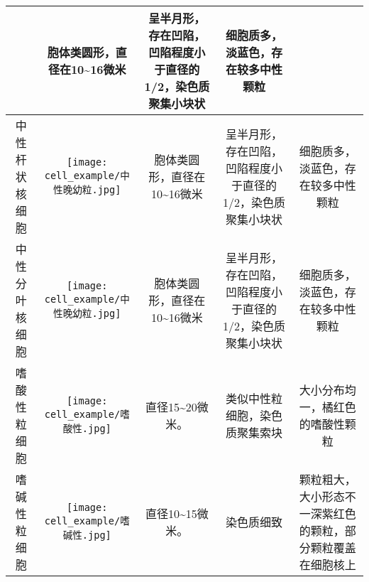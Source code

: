 \begin{longtable}{ccccc}
{\begin{minipage}[b]{0.15\textwidth}
  \end{minipage}} &  
  \multicolumn{1}{m{0.15\textwidth}}{胞体类圆形，直径在10\textasciitilde16微米} & 
  \multicolumn{1}{m{0.20\textwidth}}{呈半月形，存在凹陷，凹陷程度小于直径的1/2，染色质聚集小块状} & 
  \multicolumn{1}{m{0.20\textwidth}}{细胞质多，淡蓝色，存在较多中性颗粒}\\
  \midrule[0.5pt]
  中性杆状核细胞 & 
  \multicolumn{1}{m{0.15\textwidth}}{
  \begin{minipage}[b]{0.15\textwidth}
      \centering
      {\texttt{[image: cell\_example/中性晚幼粒.jpg]}}
  \end{minipage}} &  
  \multicolumn{1}{m{0.15\textwidth}}{胞体类圆形，直径在10\textasciitilde16微米} & 
  \multicolumn{1}{m{0.20\textwidth}}{呈半月形，存在凹陷，凹陷程度小于直径的1/2，染色质聚集小块状} & 
  \multicolumn{1}{m{0.20\textwidth}}{细胞质多，淡蓝色，存在较多中性颗粒}\\
  \midrule[0.5pt]
  中性分叶核细胞 & 
  \multicolumn{1}{m{0.15\textwidth}}{
  \begin{minipage}[b]{0.15\textwidth}
      \centering
      {\texttt{[image: cell\_example/中性晚幼粒.jpg]}}
  \end{minipage}} &  
  \multicolumn{1}{m{0.15\textwidth}}{胞体类圆形，直径在10\textasciitilde16微米} & 
  \multicolumn{1}{m{0.20\textwidth}}{呈半月形，存在凹陷，凹陷程度小于直径的1/2，染色质聚集小块状} & 
  \multicolumn{1}{m{0.20\textwidth}}{细胞质多，淡蓝色，存在较多中性颗粒}\\
  \midrule[0.5pt]
  嗜酸性粒细胞 & 
  \multicolumn{1}{m{0.15\textwidth}}{
  \begin{minipage}[b]{0.15\textwidth}
      \centering
      {\texttt{[image: cell\_example/嗜酸性.jpg]}}
  \end{minipage}} &  
  \multicolumn{1}{m{0.15\textwidth}}{直径15\textasciitilde20微米。} & 
  \multicolumn{1}{m{0.20\textwidth}}{类似中性粒细胞，染色质聚集索块} & 
  \multicolumn{1}{m{0.20\textwidth}}{大小分布均一，橘红色的嗜酸性颗粒}\\
  \midrule[0.5pt]
  嗜碱性粒细胞 & 
  \multicolumn{1}{m{0.15\textwidth}}{
  \begin{minipage}[b]{0.15\textwidth}
      \centering
      {\texttt{[image: cell\_example/嗜碱性.jpg]}}
  \end{minipage}} &  
  \multicolumn{1}{m{0.15\textwidth}}{直径10\textasciitilde15微米。} & 
  \multicolumn{1}{m{0.20\textwidth}}{染色质细致} & 
  \multicolumn{1}{m{0.20\textwidth}}{颗粒粗大，大小形态不一深紫红色的颗粒，部分颗粒覆盖在细胞核上}\\
  \bottomrule[1.5pt]
  \end{longtable}
